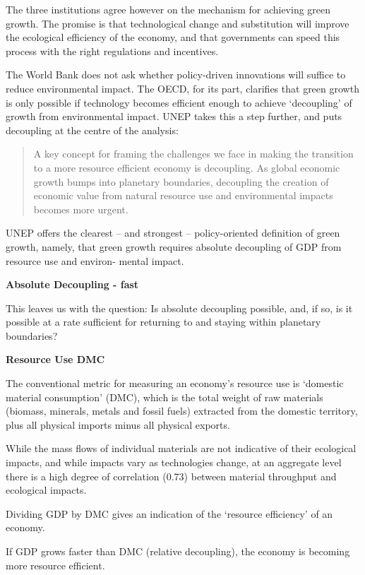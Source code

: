 \documentclass[
]{book}
\begin{document}
The three institutions agree however on the mechanism for achieving green growth. The promise is
that technological change and substitution will improve the ecological efficiency of the economy, and
that governments can speed this process with the right regulations and incentives.

The World Bank does not ask whether policy-driven innovations will suffice
to reduce environmental impact. The OECD, for its part, clarifies that green growth is only possible if
technology becomes efficient enough to achieve `decoupling' of growth from environmental impact.
UNEP takes this a step further, and puts decoupling at the centre of the analysis:

\begin{quote}
A key concept for framing the challenges we face in making the transition to a more resource efficient economy is
decoupling. As global economic growth bumps into planetary boundaries, decoupling the creation of economic
value from natural resource use and environmental impacts becomes more urgent.
\end{quote}

UNEP offers the clearest -- and strongest -- policy-oriented definition of green growth,
namely, that green growth requires absolute decoupling of GDP from resource use and environ-
mental impact.

\textbf{Absolute Decoupling - fast}

This leaves us with the question: Is absolute decoupling possible, and, if so, is it possible at a rate
sufficient for returning to and staying within planetary boundaries?

\textbf{Resource Use DMC}

The conventional metric for measuring an economy's resource use is `domestic material consumption'
(DMC), which is the total weight of raw materials (biomass, minerals, metals and fossil fuels) extracted
from the domestic territory, plus all physical imports minus all physical exports.

While the mass flows of individual materials are not indicative of their
ecological impacts, and while impacts vary as technologies change, at an aggregate level there is a
high degree of correlation (0.73) between material throughput and ecological impacts.

Dividing GDP by DMC gives an indication of the `resource efficiency' of an economy.

If GDP grows faster than DMC (relative decoupling), the economy is becoming more resource efficient.
\end{document}
